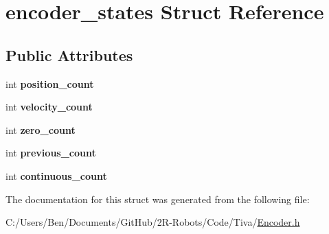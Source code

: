 \hypertarget{structencoder__states}{}\section{encoder\+\_\+states Struct Reference}
\label{structencoder__states}
\subsection*{Public Attributes}
\begin{DoxyCompactItemize}
\item 
\mbox{\label{structencoder__states_adfcc12d9efa685c664690359c663e2bc}} 
int {\bfseries position\+\_\+count}
\item 
\mbox{\label{structencoder__states_a2ae4fd7496d4ead5805a2501cfe43c5f}} 
int {\bfseries velocity\+\_\+count}
\item 
\mbox{\label{structencoder__states_aa2e3593ed7cfbf9858a7e5428250b83b}} 
int {\bfseries zero\+\_\+count}
\item 
\mbox{\label{structencoder__states_a9f5110b7a8c50aa48e32e5aded8137d2}} 
int {\bfseries previous\+\_\+count}
\item 
\mbox{\label{structencoder__states_a3de7ff7d63e0690a2331060913792309}} 
int {\bfseries continuous\+\_\+count}
\end{DoxyCompactItemize}


The documentation for this struct was generated from the following file\+:\begin{DoxyCompactItemize}
\item 
C\+:/\+Users/\+Ben/\+Documents/\+Git\+Hub/2\+R-\/\+Robots/\+Code/\+Tiva/\mbox{\hyperlink{_encoder_8h}{Encoder.\+h}}\end{DoxyCompactItemize}
